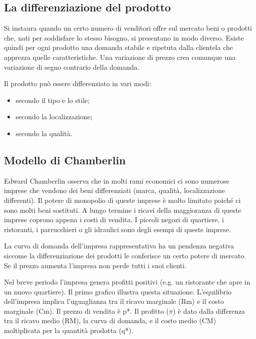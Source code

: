 \subsection{La differenziazione del prodotto}

Si instaura quando un certo numero di venditori offre sul mercato beni o 
prodotti che, nati per soddisfare lo stesso bisogno, si presentano in modo 
diverso.
Esiste quindi per ogni prodotto una domanda stabile e 
ripetuta dalla clientela che apprezza quelle caratteristiche.
Una variazione di prezzo crea comunque una variazione di segno contrario 
della domanda.

Il prodotto può essere differenziato in vari modi:
\begin{itemize} [nosep]
 \item secondo il tipo e lo stile;
 \item secondo la localizzazione;
 \item secondo la qualità.
\end{itemize}

\subsection{Modello di Chamberlin}

Edward Chamberlin
osserva che in molti rami economici ci sono 
numerose imprese che vendono dei beni differenziati (marca, qualità, 
localizzazione differenti). Il potere di monopolio di queste imprese è 
molto limitato poiché ci sono molti beni sostituti. A lungo termine i ricavi 
della maggioranza di queste imprese coprono appena i costi di vendita. I 
piccoli negozi di quartiere, i ristoranti, i parrucchieri o gli idraulici sono 
degli esempi di queste imprese.

La curva di domanda dell'impresa rappresentativa ha un pendenza negativa 
siccome la differenziazione dei prodotti le conferisce un certo potere di 
mercato. Se il prezzo aumenta l'impresa non perde tutti i suoi clienti. 

Nel breve periodo l'impresa genera profitti positivi (e.g. un ristorante che 
apre in un nuovo quartiere). Il primo grafico illustra questa situazione. 
L'equilibrio dell'impresa implica l'uguaglianza tra il ricavo marginale (Rm) e 
il costo marginale (Cm). Il prezzo di vendita è p*. Il profitto 
(\(\pi\)) è dato dalla differenza tra il ricavo medio (RM), la curva 
di domanda, e il costo medio (CM) moltiplicata per la quantità prodotta (q*).

